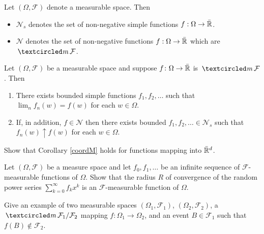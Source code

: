 \begin{definition}
Let $(\Omega, \mathcal F)$ denote a measurable space. Then
\begin{itemize}
\item $\mathscr N_s$ denotes the set of non-negative simple functions \mbox{$f:\Omega\rightarrow \bar{\Bbb R}$}.
\item $\mathscr N$ denotes the set of non-negative functions $f:\Omega\rightarrow \bar{\Bbb R}$ which are  $\mcirc \mathcal F$.
\end{itemize}
\end{definition}



\begin{theorem}
\label{thm: structure thm}
Let $(\Omega, \mathcal F)$ be a measurable space and suppose $f\colon \Omega\rightarrow \bar{\Bbb R}$ is $\mcirc \mathcal F$. Then
\begin{enumerate}
\item There exists bounded simple functions $f_1, f_2,\ldots $ such that $\lim_n f_n(w)= f(w)$ for each $w\in \Omega$.
\item If, in addition,  $f\in\mathscr N$  then there exists bounded $f_1, f_2, \ldots \in\mathscr N_s$ such that $ f_n(w)\uparrow f(w)$ for each $w\in \Omega$.
\end{enumerate}
\end{theorem}


\begin{exercise} Show that Corollary \ref{coordM} holds for functions mapping into $\bar{\Bbb R}^d$.
\end{exercise}


\begin{exercise}
Let $(\Omega, \mathcal F)$ be a measure space and let $f_0, f_1,\ldots$ be an infinite sequence of $\mathcal F$-measurable functions of $\Omega$. Show that the radius $R$ of convergence of the random power series $\sum_{k=0}^\infty f_k x^k$ is an $\mathcal F$-measurable function of $\Omega$.
\end{exercise}


\begin{exercise}
Give an example of two measurable spaces $(\Omega_1, \mathcal F_1)$,  $(\Omega_2,\mathcal F_2)$, a $\mcirc \mathcal F_1/\mathcal F_2$ mapping $f:\Omega_1\rightarrow \Omega_2$,  and an event $B\in\mathcal F_1$ such that $f(B)\notin \mathcal F_2$.
\end{exercise}



